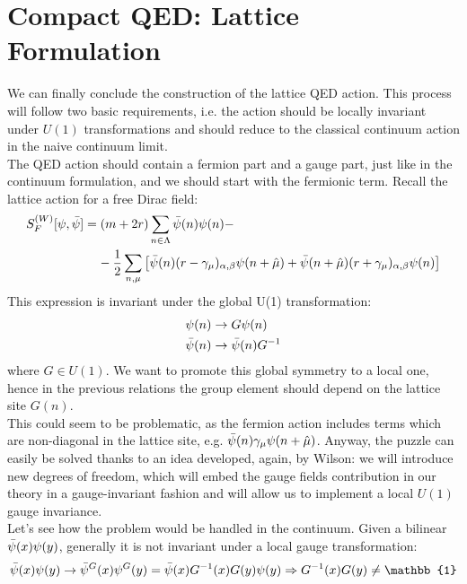 \section{Compact QED: Lattice Formulation}
We can finally conclude the construction of the lattice QED action. This process will follow two basic requirements, i.e. the action should be locally invariant under $U(1)$ transformations and should reduce to the classical continuum action in the naive continuum limit.
\\ The QED action should contain a fermion part and a gauge part, just like in the continuum formulation, and we should start with the fermionic term. Recall the lattice action for a free Dirac field:
\begin{equation}
\begin{split}
    & S_F^{(W)} [\psi, \Bar{\psi}] = (m + 2r)\sum_{n \in \Lambda} \Bar{\psi}(n)\psi(n) - \\ & \hspace{20mm} - \frac{1}{2}\sum_{n, \mu} \left[\Bar{\psi}(n)(r - \gamma_\mu)_{\alpha, \beta} \psi(n + \hat{\mu}) + \Bar{\psi}(n + \hat{\mu})(r + \gamma_\mu)_{\alpha, \beta} \psi(n) \right]
\end{split}
\end{equation}
This expression is invariant under the global U(1) transformation:
\begin{equation*}
    \begin{split}
       & \psi(n) \to G\psi(n) \\
       & \Bar{\psi}(n) \to \Bar{\psi}(n) G^{-1}
    \end{split}
\end{equation*}
where $G \in U(1).$ We want to promote this global symmetry to a local one, hence in the previous relations the group element should depend on the lattice site $G(n).$ \\ This could seem to be problematic, as the fermion action includes terms which are non-diagonal in the lattice site, e.g. $\Bar{\psi}(n)\gamma_\mu\psi(n + \hat{\mu})$. Anyway, the puzzle can easily be solved thanks to an idea developed, again, by Wilson: we will introduce new degrees of freedom, which will embed the gauge fields contribution in our theory in a gauge-invariant fashion and will allow us to implement a local $U(1)$ gauge invariance.
\\ Let's see how the problem would be handled in the continuum. Given a bilinear $\Bar{\psi}(x) \psi(y)$, generally it is not invariant under a local gauge transformation:
\begin{equation*}
    \Bar{\psi}(x) \psi(y) \to \Bar{\psi}^G(x) \psi^G(y) = \Bar{\psi}(x) G^{-1}(x) G(y) \psi(y) \Rightarrow G^{-1} (x) G(y) \neq \mathbb{1}
\end{equation*}
